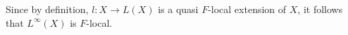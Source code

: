 \begin{rmk}
Since by definition, $l:X\to L(X)$ is a quasi $F$-local extension of $X$, it follows that $L^\infty(X)$ is $F$-local.
\end{rmk}

\begin{comment}
\begin{lem}
Let $X$ be a type and let $f:P(a)\to X$. Then we have an equivalence
\begin{equation*}
\eqv{\hfib{\psi_{L^\infty(X)}}{\iota_0\circ f}}{\tfcolim_n(\hfib{\psi_{L^n(X)}}{l^n\circ f})}.
\end{equation*}
\end{lem}

\begin{proof}
This follows from a simple calculation using the facts about $\omega$-compact
types of the previous section:
\begin{align*}
\hfib{\psi_{L^\infty(X)}}{\iota_0\circ f}
  & \jdeq
\sm{g:Q(a)\to L^\infty(X)} \id{g\circ F(a)}{\iota_0\circ f} \\
& \eqvsym \sm{g:\tfcolim_n(Q(a)\to L^n(X)} \id{\xi_{Q(a)}(g)\circ F(a)}{\iota_0\circ f}) \\
& \eqvsym \tfcolim_n(\sm{g:Q(a)\to L^n(X)} \id{\iota_n\circ g\circ F(a)}{\iota_0\circ f}) \\
& \eqvsym \tfcolim_n(\sm{g:Q(a)\to L^n(X)} \prd{u:P(a)}\id{\iota_n(g(F(a,u)))}{\iota_0(f(u))} \\
& \eqvsym \tfcolim_n(\sm{g:Q(a)\to L^n(X)} \prd{u:P(a)}\tfcolim_m(\id{\iota_{n+m}(g(F(a,u)))}{\iota_{n+m}(l^{n+m}(f(u)))}) \\
& \eqvsym \tfcolim_n(\sm{g:Q(a)\to L^n(X)} \tfcolim_m(\prd{u:P(a)}\id{\iota_{n+m}(g(F(a,u)))}{\iota_{n+m}(l^{n+m}(f(u)))}) \\
& \eqvsym \tfcolim_n(\sm{g:Q(a)\to L^n(X)} \id{g\circ F(a)}{l^n\circ f}) \\
& \jdeq \tfcolim_n(\hfib{\psi_{L^n(X)}}{l^n\circ f}).\qedhere
\end{align*}
\end{proof}
\end{comment}

\begin{comment}
\begin{cor}
For any $m:\nat$ and $f:P(a)\to L^m(X)$, we have an equivalence
\begin{equation*}
\eqv{\hfib{\psi_{L^\infty(X)}}{\iota_n\circ f}}{\tfcolim_{n\geq m}(\hfib{\psi_{L^n(X)}}{l^{n-m}\circ f})}.
\end{equation*}
\end{cor}
\end{comment}

